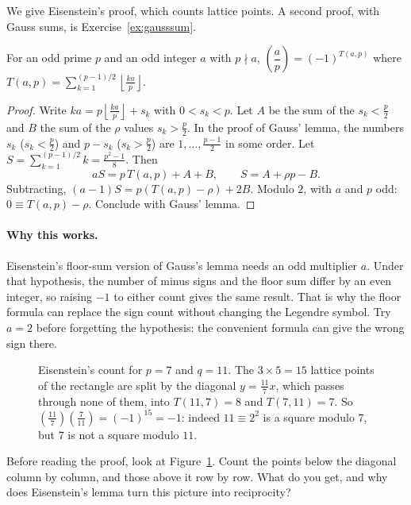 We give Eisenstein's proof, which counts lattice points. A second proof, with Gauss sums, is Exercise~\ref{ex:gausssum}.

\begin{lemma}[Eisenstein]\label{lem:eisenstein}
For an odd prime $p$ and an odd integer $a$ with $p\nmid a$, $\left(\dfrac ap\right)=(-1)^{T(a,p)}$ where $T(a,p)=\displaystyle\sum_{k=1}^{(p-1)/2}\left\lfloor\frac{ka}p\right\rfloor$.
\end{lemma}
\begin{proof}
Write $ka=p\left\lfloor\frac{ka}p\right\rfloor+s_k$ with $0<s_k<p$. Let $A$ be the sum of the $s_k<\frac p2$ and $B$ the sum of the $\rho$ values $s_k>\frac p2$. In the proof of Gauss' lemma, the numbers $s_k$ ($s_k<\frac p2$) and $p-s_k$ ($s_k>\frac p2$) are $1,\dots,\frac{p-1}2$ in some order. Let $S=\sum_{k=1}^{(p-1)/2}k=\frac{p^2-1}8$. Then
\[
aS=p\,T(a,p)+A+B,\qquad S=A+\rho p-B.
\]
Subtracting, $(a-1)S=p\left(T(a,p)-\rho\right)+2B$. Modulo $2$, with $a$ and $p$ odd: $0\equiv T(a,p)-\rho$. Conclude with Gauss' lemma.
\end{proof}

\paragraph{Why this works.}
Eisenstein's floor-sum version of Gauss's lemma needs an odd multiplier $a$. Under that hypothesis, the number of minus signs and the floor sum differ by an even integer, so raising $-1$ to either count gives the same result. That is why the floor formula can replace the sign count without changing the Legendre symbol. Try $a=2$ before forgetting the hypothesis: the convenient formula can give the wrong sign there.

\begin{figure}[ht]
\centering
{}
\caption{Eisenstein's count for $p=7$ and $q=11$. The $3\times5=15$ lattice points of the rectangle are split by the diagonal $y=\frac{11}7x$, which passes through none of them, into $T(11,7)=8$ and $T(7,11)=7$. So $\left(\frac{11}7\right)\left(\frac7{11}\right)=(-1)^{15}=-1$: indeed $11\equiv2^2$ is a square modulo $7$, but $7$ is not a square modulo $11$.}
\label{fig:eisenstein}
\end{figure}

\begin{think}
Before reading the proof, look at Figure~\ref{fig:eisenstein}. Count the points below the diagonal column by column, and those above it row by row. What do you get, and why does Eisenstein's lemma turn this picture into reciprocity?
\end{think}

